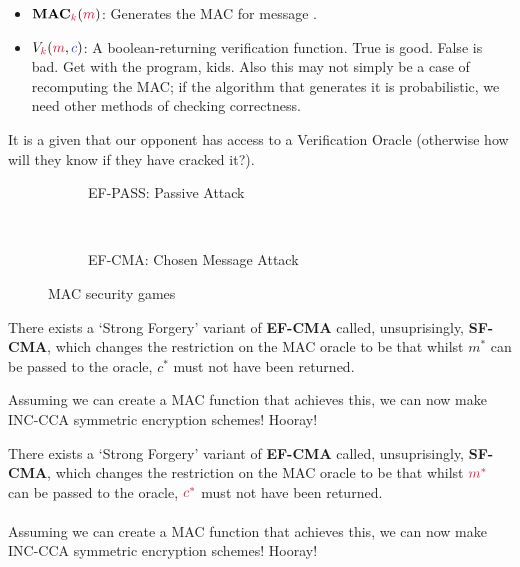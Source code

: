    \begin{itemize}
        \item $\textbf{MAC}_{\ck}(\cm)$: Generates the MAC for message \emph{\cm}.
        \item $V_{\ck}(\cm, \cc)$: A boolean-returning verification function. True is good. False is bad. Get with the program, kids. Also this may not simply be a case of recomputing the MAC; if the algorithm that generates it is probabilistic, we need other methods of checking correctness.
    \end{itemize}
    It is a given that our opponent has access to a Verification Oracle (otherwise how will they know if they have cracked it?). 

    \begin{figure}[htp!]
    \centering
    \begin{subfigure}[b]{0.4\textwidth}
        \centering
        \begin{cryptogame}{}
            \cgameleft{$\cmast$, $\ccast$}
        \end{cryptogame}
        \caption{EF-PASS: Passive Attack}
        \label{fig:ef-pass}
    \end{subfigure}
    ~
    \begin{subfigure}[b]{0.4\textwidth}
        \centering
        \begin{cryptogame}{}
            \cgameleft{$\cmast$, $\ccast$}
        \end{cryptogame}
        \caption{EF-CMA: Chosen Message Attack}
        \label{fig:ef-cma}
    \end{subfigure}
    \caption{MAC security games}
    \label{fig:ef-games}
\end{figure}

    There exists a `Strong Forgery' variant of \textbf{EF-CMA} called, unsuprisingly, \textbf{SF-CMA}, which changes the restriction on the MAC oracle to be that whilst $m^{*}$ can be passed to the oracle, $c^{*}$ must not have been returned.

    Assuming we can create a MAC function that achieves this, we can now make INC-CCA symmetric encryption schemes! Hooray!

    There exists a `Strong Forgery' variant of \textbf{EF-CMA} called, unsuprisingly, \textbf{SF-CMA}, which changes the restriction on the MAC oracle to be that whilst $\cmast$ can be passed to the oracle, $\ccast$ must not have been returned.\\
    \\
    Assuming we can create a MAC function that achieves this, we can now make INC-CCA symmetric encryption schemes! Hooray!

